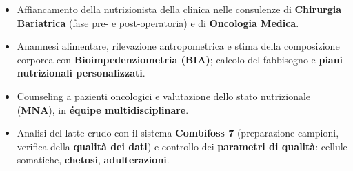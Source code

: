 \documentclass[10pt,a4paper]{altacv}
\begin{document}



 \begin{itemize} 
  \item Affiancamento della nutrizionista della clinica nelle consulenze di \textbf{Chirurgia Bariatrica} (fase pre- e post-operatoria) e di \textbf{Oncologia Medica}.

  \item Anamnesi alimentare, rilevazione antropometrica e stima della composizione corporea con \textbf{Bioimpedenziometria (BIA)}; calcolo del fabbisogno e \textbf{piani nutrizionali personalizzati}.

  \item Counseling a pazienti oncologici e valutazione dello stato nutrizionale (\textbf{MNA}), in \textbf{équipe multidisciplinare}.
 \end{itemize}

\vspace{0.5em}

 \begin{itemize} 
%   
  \item Analisi del latte crudo con il sistema \textbf{Combifoss 7} (preparazione campioni, verifica della \textbf{qualità dei dati}) e controllo dei \textbf{parametri di qualità}: cellule somatiche, \textbf{chetosi}, \textbf{adulterazioni}.
 \end{itemize}
\end{document}
